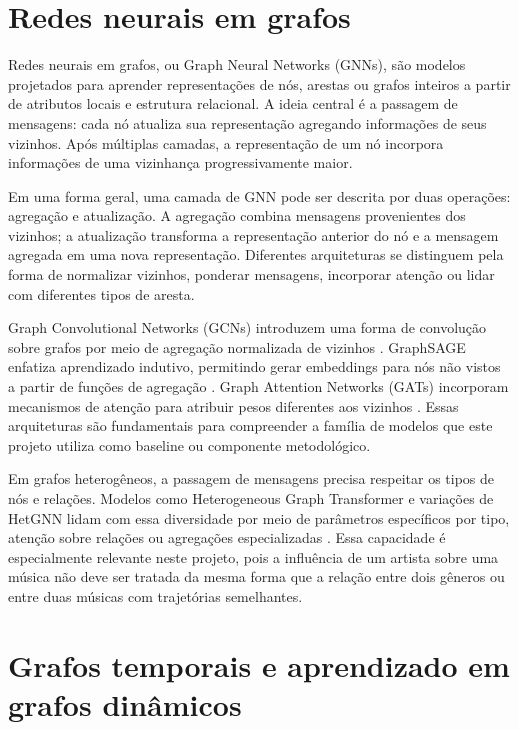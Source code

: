 
\section{Redes neurais em grafos}

Redes neurais em grafos, ou Graph Neural Networks (GNNs), são modelos projetados para aprender representações de nós, arestas ou grafos inteiros a partir de atributos locais e estrutura relacional. A ideia central é a passagem de mensagens: cada nó atualiza sua representação agregando informações de seus vizinhos. Após múltiplas camadas, a representação de um nó incorpora informações de uma vizinhança progressivamente maior.

Em uma forma geral, uma camada de GNN pode ser descrita por duas operações: agregação e atualização. A agregação combina mensagens provenientes dos vizinhos; a atualização transforma a representação anterior do nó e a mensagem agregada em uma nova representação. Diferentes arquiteturas se distinguem pela forma de normalizar vizinhos, ponderar mensagens, incorporar atenção ou lidar com diferentes tipos de aresta.

Graph Convolutional Networks (GCNs) introduzem uma forma de convolução sobre grafos por meio de agregação normalizada de vizinhos \citep{kipf2017gcn}. GraphSAGE enfatiza aprendizado indutivo, permitindo gerar embeddings para nós não vistos a partir de funções de agregação \citep{hamilton2017graphsage}. Graph Attention Networks (GATs) incorporam mecanismos de atenção para atribuir pesos diferentes aos vizinhos \citep{velickovic2018gat}. Essas arquiteturas são fundamentais para compreender a família de modelos que este projeto utiliza como baseline ou componente metodológico.

Em grafos heterogêneos, a passagem de mensagens precisa respeitar os tipos de nós e relações. Modelos como Heterogeneous Graph Transformer e variações de HetGNN lidam com essa diversidade por meio de parâmetros específicos por tipo, atenção sobre relações ou agregações especializadas \citep{hu2020hgt}. Essa capacidade é especialmente relevante neste projeto, pois a influência de um artista sobre uma música não deve ser tratada da mesma forma que a relação entre dois gêneros ou entre duas músicas com trajetórias semelhantes.


\section{Grafos temporais e aprendizado em grafos dinâmicos}

